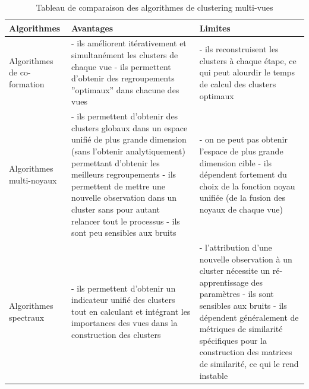   	  \begin{longtable}{|p{4.5cm}|p{6cm}|p{6cm}|}
  		  \caption{Tableau de comparaison des algorithmes de clustering multi-vues}
  		  \label{tab:comp_multivues}
  			  \hline
 				   \textbf{Algorithmes} & \textbf{Avantages} & \textbf{Limites} \\
  			  \hline
     				   Algorithmes de co-formation
     				   &
     				   {- ils améliorent itérativement et simultanément les clusters de chaque vue} \newline\newline
     				   {- ils permettent d’obtenir des regroupements ”optimaux” dans chacune des vues}
     				   &
     				   {- ils reconstruisent les clusters à chaque étape, ce qui peut alourdir le temps de calcul des clusters optimaux}
     				   \\
     				   \hline
     				   Algorithmes multi-noyaux
     				   &
     				   {- ils permettent d'obtenir des clusters globaux dans un espace unifié de plus grande dimension (sans l'obtenir analytiquement) permettant d'obtenir les meilleurs regroupements } \newline\newline
     				   {- ils permettent de mettre une nouvelle observation dans un cluster sans pour autant relancer tout le processus} \newline\newline
     				   {- ils sont peu sensibles aux bruits}
     				   &
     				   {- on ne peut pas obtenir l'espace de plus grande dimension cible} \newline\newline
     				   {- ils dépendent fortement du choix de la fonction noyau unifiée (de la fusion des noyaux de chaque vue)}
     				   \\
  			  \hline
     				   Algorithmes spectraux
     				   &
     				   {- ils permettent d'obtenir un indicateur unifié des clusters tout en calculant et intégrant les importances des vues dans la construction des clusters}
     				   &
     				   {- l'attribution d'une nouvelle observation à un cluster nécessite un ré-apprentissage des paramètres} \newline\newline
          			  {- ils sont sensibles aux bruits} \newline\newline
     				   {- ils dépendent généralement de métriques de similarité spécifiques pour la construction des matrices de similarité, ce qui le rend instable } \newline\newline

\end{longtable}
